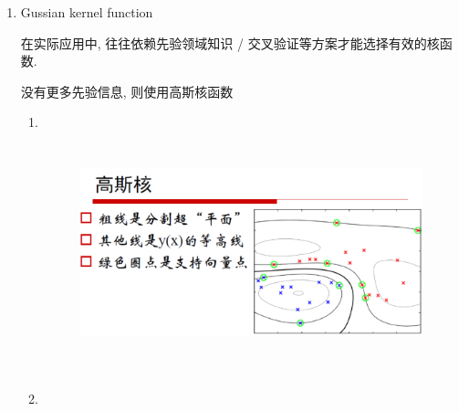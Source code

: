 \documentclass[oneside, 12pt]{ctexbook}
\begin{document}
\begin{enumerate}
					\item Gussian kernel function
					
						在实际应用中, 往往依赖先验领域知识 / 交叉验证等方案才能选择有效的核函数. 
						
						没有更多先验信息, 则使用高斯核函数
						\begin{enumerate}[]
							\item 						
							\begin{figure}[H]
								\vspace{-0.2cm}  %
								\setlength{\abovecaptionskip}{-0.2cm}   %
								\centering
								\includegraphics[height=7cm,width=14cm]{concept_gussian_kernel_function.png}
								\renewcommand{\figurename}{Fig} %
							\end{figure}
							
							\item 
							\begin{figure}[H]
								\centering
								\vspace{-0.2cm}  %
								\setlength{\abovecaptionskip}{-0.2cm}   %
								

\end{figure}
\end{enumerate}
\end{enumerate}
\end{document}
